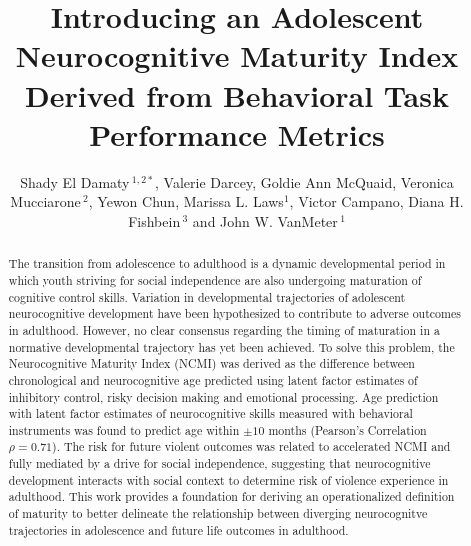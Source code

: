 \documentclass[utf8]{frontiersSCNS} %
\def\firstAuthorLast{El Damaty {et~al.}} %
\def\Authors{Shady El Damaty\,$^{1,2*}$, Valerie Darcey, Goldie Ann McQuaid, Veronica Mucciarone\,$^{2}$, Yewon Chun, Marissa L. Laws$^{1}$, Victor Campano, Diana H. Fishbein\,$^{3}$ and John W. VanMeter\,$^{1}$}
\begin{document}
\onecolumn
{}
\title{Introducing an Adolescent Neurocognitive Maturity Index Derived from Behavioral Task Performance Metrics} 
\author[\firstAuthorLast ]{\Authors} %
\address{} %
\correspondance{} %
\extraAuth{}
\maketitle \begin{abstract}

The transition from adolescence to adulthood is a dynamic developmental period in which youth striving for social independence are also undergoing maturation of cognitive control skills. Variation in developmental trajectories of adolescent neurocognitive development have been hypothesized to contribute to adverse outcomes in adulthood. However, no clear consensus regarding the timing of maturation in a normative developmental trajectory has yet been achieved. To solve this problem, the Neurocognitive Maturity Index (NCMI) was derived as the difference between chronological and neurocognitive age predicted using latent factor estimates of inhibitory control, risky decision making and emotional processing. Age prediction with latent factor estimates of neurocognitive skills measured with behavioral instruments was found to predict age within $\pm 10$ months (Pearson's Correlation $\rho=0.71$). The risk for future violent outcomes was related to accelerated NCMI and fully mediated by a drive for social independence, suggesting that neurocognitive development interacts with social context to determine risk of violence experience in adulthood. This work provides a foundation for deriving an operationalized definition of maturity to better delineate the relationship between diverging neurocognitve trajectories in adolescence and future life outcomes in adulthood.

\section{}


\end{abstract}
\end{document}

